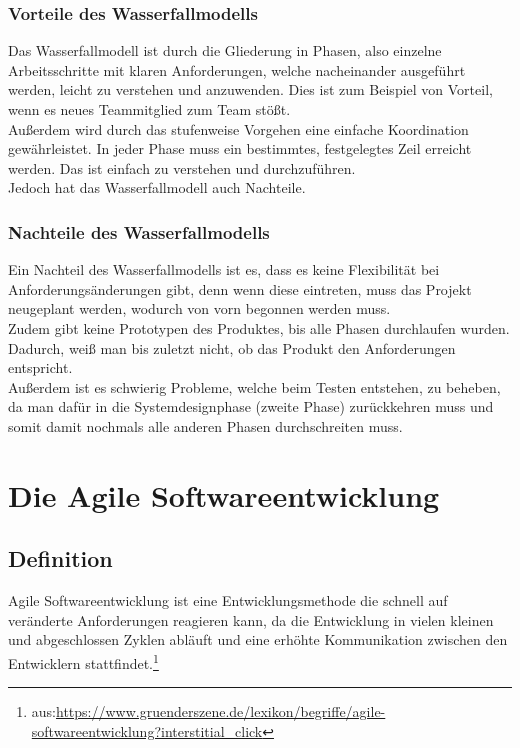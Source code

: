 \documentclass[a4paper, 10pt]{scrartcl}
\begin{document}
\subsubsection{Vorteile des Wasserfallmodells}
Das Wasserfallmodell ist durch die Gliederung in Phasen, also einzelne Arbeitsschritte mit klaren Anforderungen, welche nacheinander ausgeführt werden, leicht zu verstehen und anzuwenden. Dies ist zum Beispiel von Vorteil, wenn es neues Teammitglied zum Team stößt.\\
Außerdem wird durch das stufenweise Vorgehen eine einfache Koordination gewährleistet. In jeder Phase muss ein bestimmtes, festgelegtes Zeil erreicht werden. Das ist einfach zu verstehen und durchzuführen. \citep{stoica}\\
Jedoch hat das Wasserfallmodell auch Nachteile.
\subsubsection{Nachteile des Wasserfallmodells}
Ein Nachteil des Wasserfallmodells ist es, dass es keine Flexibilität bei Anforderungsänderungen gibt, denn wenn diese eintreten, muss das Projekt neugeplant werden, wodurch von vorn begonnen werden muss.\\
Zudem gibt keine Prototypen des Produktes, bis alle Phasen durchlaufen wurden. Dadurch, weiß man bis zuletzt nicht, ob das Produkt den Anforderungen entspricht.\\
Außerdem ist es schwierig Probleme, welche beim Testen entstehen, zu beheben, da man dafür in die Systemdesignphase (zweite Phase) zurückkehren muss und somit damit nochmals alle anderen Phasen durchschreiten muss. \citep{stoica}

\newpage
\section{Die Agile Softwareentwicklung} \label{agil}
\subsection{Definition}
\begin{center}
\large{\glqq{} Agile Softwareentwicklung ist eine Entwicklungsmethode die schnell auf veränderte Anforderungen reagieren kann, da die Entwicklung in vielen kleinen und abgeschlossen Zyklen abläuft und eine erhöhte Kommunikation zwischen den Entwicklern stattfindet.\grqq{}}\footnote{aus:\url{https://www.gruenderszene.de/lexikon/begriffe/agile-softwareentwicklung?interstitial_click}} \\
\end{center}
\end{document}
